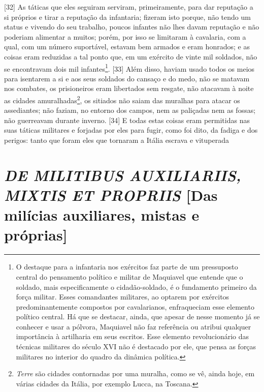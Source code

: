{[}32{]} As táticas que eles seguiram serviram, primeiramente, para dar
reputação a si próprios e tirar a reputação da infantaria; fizeram isto
porque, não tendo um status e vivendo do seu trabalho, poucos infantes
não lhes davam reputação e não poderiam alimentar a muitos; porém, por
isso se limitaram à cavalaria, com a qual, com um número suportável,
estavam bem armados e eram honrados; e as coisas eram reduzidas a tal
ponto que, em um exército de vinte mil soldados, não se encontravam dois
mil infantes\footnote{O destaque para a infantaria nos exércitos faz
  parte de um pressuposto central do pensamento político e militar de
  Maquiavel que entende que o soldado, mais especificamente o
  cidadão-soldado, é o fundamento primeiro da força militar. Esses
  comandantes militares, ao optarem por exércitos predominantemente
  compostos por cavalarianos, enfraqueciam esse elemento político
  central. Há que se destacar, ainda, que apesar de nesse momento já se
  conhecer e usar a pólvora, Maquiavel não faz referência ou atribui
  qualquer importância à artilharia em seus escritos. Esse elemento
  revolucionário das técnicas militares do século XVI não é destacado
  por ele, que pensa as forças militares no interior do quadro da
  dinâmica política.}. {[}33{]} Além disso, haviam usado todos os meios
para isentarem a si e aos seus soldados do cansaço e do medo, não se
matavam nos combates, os prisioneiros eram libertados sem resgate, não
atacavam à noite as cidades amuralhadas\footnote{\emph{Terre} são
  cidades contornadas por uma muralha, como se vê, ainda hoje, em várias
  cidades da Itália, por exemplo Lucca, na Toscana.}, os sitiados não
saiam das muralhas para atacar os assediantes; não faziam, no entorno
dos campos, nem as paliçadas nem as fossas; não guerreavam durante
inverno. {[}34{]} E todas estas coisas eram permitidas nas suas táticas
militares e forjadas por eles para fugir, como foi dito, da fadiga e dos
perigos: tanto que foram eles que tornaram a Itália escrava e vituperada

\quebra\section{\emph{DE MILITIBUS AUXILIARIIS, MIXTIS ET PROPRIIS}
{[}Das milícias auxiliares, mistas e próprias{]}}

